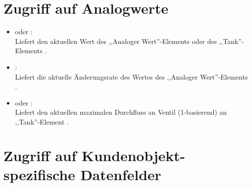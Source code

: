 \section{Zugriff auf Analogwerte}
  
\begin{itemize}

\item
{} oder :\\
Liefert den aktuellen Wert des ,,Analoger Wert''-Elements oder des ,,Tank''-Elements .

\item
{}:\\
Liefert die aktuelle Änderungsrate des Wertes des ,,Analoger Wert''-Elements .

\item
{} oder :\\
Liefert den aktuellen maximalen Durchfluss an Ventil  (1-basierend) an ,,Tank''-Element .

\end{itemize}



\section{Zugriff auf Kundenobjekt-spezifische Datenfelder}


